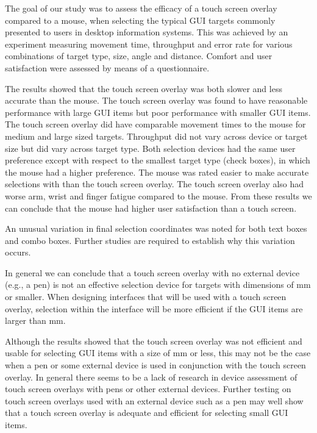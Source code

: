 \documentclass{elsart}
\begin{document}
The goal of our study was to assess the efficacy of a touch screen
overlay compared to a mouse, when selecting the typical GUI targets
commonly presented to users in desktop information systems. This was
achieved by an experiment measuring movement time, throughput and error
rate for various combinations of target type, size, angle and distance.
Comfort and user satisfaction were assessed by means of a questionnaire.

The results showed that the touch screen overlay was both slower and
less accurate than the mouse. The touch screen overlay was found to have
reasonable performance with large GUI items but poor performance with
smaller GUI items. The touch screen overlay did have comparable movement
times to the mouse for medium and large sized targets. Throughput did
not vary across device or target size but did vary across target type.
Both selection devices had the same user preference except with respect
to the smallest target type (check boxes), in which the mouse had a
higher preference. The mouse was rated easier to make accurate
selections with than the touch screen overlay. The touch screen overlay
also had worse arm, wrist and finger fatigue compared to the mouse. From
these results we can conclude that the mouse had higher user
satisfaction than a touch screen.

An unusual variation in final selection coordinates was noted for both
text boxes and combo boxes. Further studies are required to establish
why this variation occurs.

In general we can conclude that a touch screen overlay with no external
device (e.g., a pen) is not an effective selection device for targets
with dimensions of \unit[4]{mm} or smaller. When designing interfaces
that will be used with a touch screen overlay, selection within the
interface will be more efficient if the GUI items are larger than
\unit[4]{mm}.

Although the results showed that the touch screen overlay was not
efficient and usable for selecting GUI items with a size of \unit[4]{mm}
or less, this may not be the case when a pen or some external device is
used in conjunction with the touch screen overlay. In general there
seems to be a lack of research in device assessment of touch screen
overlays with pens or other external devices. Further testing on touch
screen overlays used with an external device such as a pen may well show
that a touch screen overlay is adequate and efficient for selecting
small GUI items.
\end{document}
